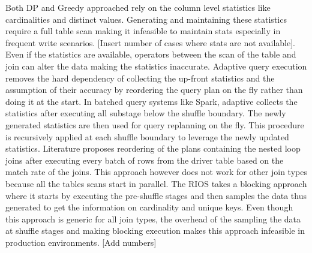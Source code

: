 Both DP and Greedy approached rely on the column level statistics like cardinalities and distinct values. Generating and maintaining these statistics require a full table scan making it infeasible to maintain stats especially in frequent write scenarios. [Insert number of cases where stats are not available]. Even if the statistics are available, operators between the scan of the table and join can alter the data making the statistics inaccurate. Adaptive query execution removes the hard dependency of collecting the up-front statistics and the assumption of their accuracy by reordering the query plan on the fly rather than doing it at the start. In batched query systems like Spark, adaptive collects the statistics after executing all substage below the shuffle boundary.
The newly generated statistics are then used for query replanning on the fly. This procedure is recursively applied at each shuffle boundary to leverage the newly updated statistics. Literature \cite{b7} proposes reordering of the plans containing the nested loop joins after executing every batch of rows from the driver table based on the match rate of the joins. This approach however does not work for other join types because all the tables scans start in parallel. The  RIOS \cite{b8} takes a blocking approach where it starts by executing the pre-shuffle stages and then samples the data thus generated to get the information on cardinality and unique keys. Even though this approach is generic for all join types, the overhead of the sampling the data at shuffle stages and making blocking execution makes this approach infeasible in production environments. [Add numbers]
